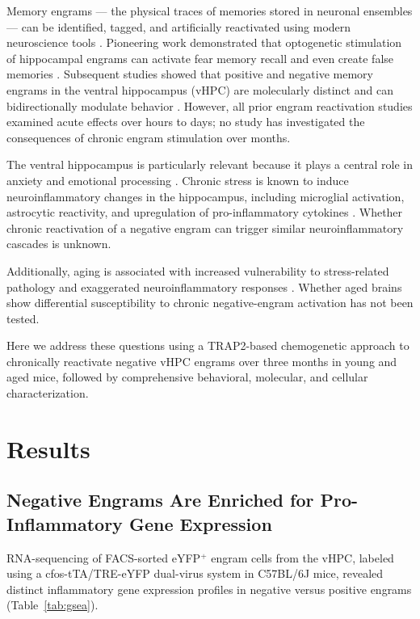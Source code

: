 \documentclass[11pt]{article}
\begin{document}
Memory engrams --- the physical traces of memories stored in neuronal ensembles --- can be identified, tagged, and artificially reactivated using modern neuroscience tools \citep{josselyn2015finding, tonegawa2015memory}. Pioneering work demonstrated that optogenetic stimulation of hippocampal engrams can activate fear memory recall \citep{liu2012optogenetic} and even create false memories \citep{ramirez2013creating}. Subsequent studies showed that positive and negative memory engrams in the ventral hippocampus (vHPC) are molecularly distinct and can bidirectionally modulate behavior \citep{redondo2014bidirectional}. However, all prior engram reactivation studies examined acute effects over hours to days; no study has investigated the consequences of chronic engram stimulation over months.

The ventral hippocampus is particularly relevant because it plays a central role in anxiety and emotional processing \citep{fanselow2010hippocampus, kheirbek2013dorsal}. Chronic stress is known to induce neuroinflammatory changes in the hippocampus, including microglial activation, astrocytic reactivity, and upregulation of pro-inflammatory cytokines \citep{wohleb2016integrating, yirmiya2015depression}. Whether chronic reactivation of a negative engram can trigger similar neuroinflammatory cascades is unknown.

Additionally, aging is associated with increased vulnerability to stress-related pathology and exaggerated neuroinflammatory responses \citep{miller2010aging, frank2018microglia}. Whether aged brains show differential susceptibility to chronic negative-engram activation has not been tested.

Here we address these questions using a TRAP2-based chemogenetic approach to chronically reactivate negative vHPC engrams over three months in young and aged mice, followed by comprehensive behavioral, molecular, and cellular characterization.

\section{Results}

\subsection{Negative Engrams Are Enriched for Pro-Inflammatory Gene Expression}

RNA-sequencing of FACS-sorted eYFP$^+$ engram cells from the vHPC, labeled using a cfos-tTA/TRE-eYFP dual-virus system in C57BL/6J mice, revealed distinct inflammatory gene expression profiles in negative versus positive engrams (Table~\ref{tab:gsea}).
\end{document}
